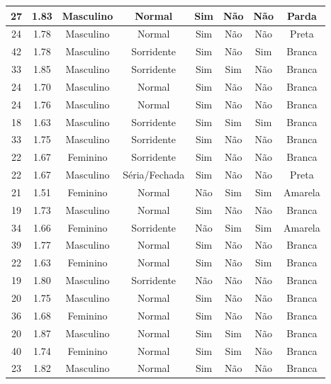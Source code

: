 \begin{table}[!ht]
\begin{tabular}{c | c | c | c | c | c | c | c}
        27 & 1.83 & Masculino & Normal & Sim & Não & Não & Parda \\ \hline
        24 & 1.78 & Masculino & Normal & Sim & Não & Não & Preta \\ \hline
        42 & 1.78 & Masculino & Sorridente & Sim & Não & Sim & Branca \\ \hline
        33 & 1.85 & Masculino & Sorridente & Sim & Sim & Não & Branca \\ \hline
        24 & 1.70 & Masculino & Normal & Sim & Não & Não & Branca \\ \hline
        24 & 1.76 & Masculino & Normal & Sim & Não & Não & Branca \\ \hline
        18 & 1.63 & Masculino & Sorridente & Sim & Sim & Sim & Branca \\ \hline
        33 & 1.75 & Masculino & Sorridente & Sim & Não & Não & Branca \\ \hline
        22 & 1.67 & Feminino  & Sorridente & Sim & Não & Não & Branca \\ \hline
        22 & 1.67 & Masculino & Séria/Fechada & Sim & Não & Não & Preta \\ \hline
        21 & 1.51 & Feminino  & Normal & Não & Sim & Sim & Amarela \\ \hline
        19 & 1.73 & Masculino & Normal & Sim & Não & Não & Branca \\ \hline
        34 & 1.66 & Feminino  & Sorridente & Não & Sim & Sim & Amarela \\ \hline
        39 & 1.77 & Masculino & Normal & Sim & Não & Não & Branca \\ \hline
        22 & 1.63 & Feminino  & Normal & Sim & Não & Sim & Branca \\ \hline
        19 & 1.80 & Masculino & Sorridente & Não & Não & Não & Branca \\ \hline
        20 & 1.75 & Masculino & Normal & Sim & Não & Não & Branca \\ \hline
        36 & 1.68 & Feminino  & Normal & Sim & Não & Não & Branca \\ \hline
        20 & 1.87 & Masculino & Normal & Sim & Sim & Não & Branca \\ \hline
        40 & 1.74 & Feminino  & Normal & Sim & Sim & Não & Branca \\ \hline
        23 & 1.82 & Masculino & Normal & Sim & Não & Não & Branca \\ \hline
	\end{tabular}
\end{table}

